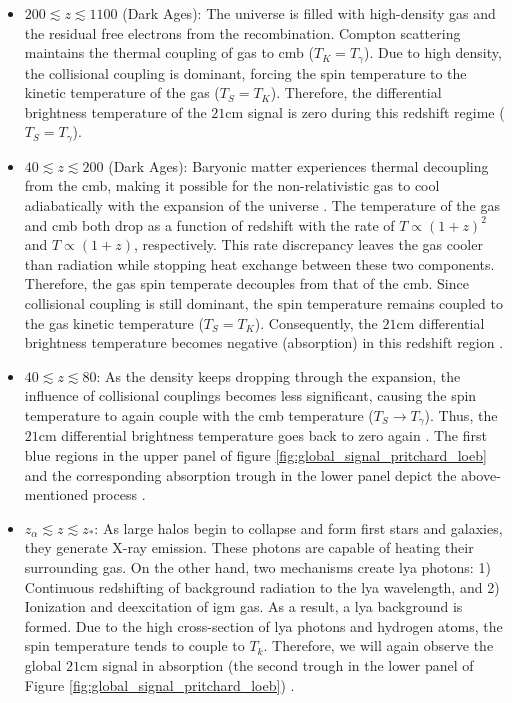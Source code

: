\documentclass[12pt, TexShade, letterpaper]{report}
\begin{document}
\begin{itemize}
\item $200 \lesssim z \lesssim 1100$ (Dark Ages): The universe is filled with high-density gas and the residual free electrons from the recombination. Compton scattering maintains the thermal coupling of gas to \gls{cmb} ($T_K = T_\gamma$). Due to high density, the collisional coupling is dominant, forcing the spin temperature to the kinetic temperature of the gas ($T_S = T_K$). 
Therefore, the differential brightness temperature of the $\mathrm{21cm}$ signal is zero during this redshift regime ($T_S = T_\gamma$)\cite{21century}.\par

\item $40 \lesssim z \lesssim 200$ (Dark Ages): Baryonic matter experiences thermal decoupling from the \gls{cmb}, making it possible for the non-relativistic gas to cool adiabatically with the expansion of the universe \cite{21century}. The temperature of the gas and \gls{cmb} both drop as a function of redshift with the rate of $T\propto (1+z)^{2}$ and $T\propto (1+z)$, respectively. This rate discrepancy leaves the gas cooler than radiation while stopping heat exchange between these two components. Therefore, the gas spin temperate decouples from that of the \gls{cmb}. Since collisional coupling is still dominant, the spin temperature remains coupled to the gas kinetic temperature ($T_S = T_K$). Consequently, the $\mathrm{21cm}$ differential brightness temperature becomes negative (absorption) in this redshift region \cite{map_universe, 21century}.\par

\item $40 \lesssim z \lesssim 80$: As the density keeps dropping through the expansion, the influence of collisional couplings becomes less significant, causing the spin temperature to again couple with the \gls{cmb} temperature ($T_S \rightarrow T_\gamma$). Thus, the $\mathrm{21cm}$ differential brightness temperature goes back to zero again \cite{map_universe}. The first blue regions in the upper panel of figure \ref{fig:global_signal_pritchard_loeb} and the corresponding absorption trough in the lower panel depict the above-mentioned process \cite{map_universe, 21century}.\par

\item $z_\alpha \lesssim z \lesssim z_*$: As large halos begin to collapse and form first stars and galaxies, they generate X-ray emission. These photons are capable of heating their surrounding gas. On the other hand, two mechanisms create \gls{lya} photons: 1) Continuous redshifting of background radiation to the \gls{lya} wavelength, and 2) Ionization and deexcitation of \gls{igm} gas. As a result, a \gls{lya} background is formed. Due to the high cross-section of \gls{lya} photons and hydrogen atoms, the spin temperature tends to couple to $T_k$. Therefore, we will again observe the global $\mathrm{21cm}$ signal in absorption (the second trough in the lower panel of Figure \ref{fig:global_signal_pritchard_loeb}) \cite{map_universe, 21century}.\par


\end{itemize}
\end{document}
